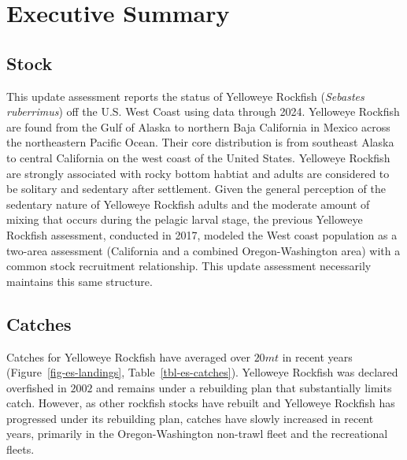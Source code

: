 \documentclass[
]{scrartcl}
\begin{document}
\newpage{}

\newpage{}


\section*{Executive Summary}\label{executive-summary}

\subsection*{Stock}\label{stock}

This update assessment reports the status of Yelloweye Rockfish
(\emph{Sebastes ruberrimus}) off the U.S. West Coast using data through
2024. Yelloweye Rockfish are found from the Gulf of Alaska to northern
Baja California in Mexico across the northeastern Pacific Ocean. Their
core distribution is from southeast Alaska to central California on the
west coast of the United States. Yelloweye Rockfish are strongly
associated with rocky bottom habtiat and adults are considered to be
solitary and sedentary after settlement. Given the general perception of
the sedentary nature of Yelloweye Rockfish adults and the moderate
amount of mixing that occurs during the pelagic larval stage, the
previous Yelloweye Rockfish assessment, conducted in 2017, modeled the
West coast population as a two-area assessment (California and a
combined Oregon-Washington area) with a common stock recruitment
relationship. This update assessment necessarily maintains this same
structure.

\subsection*{Catches}\label{catches}

Catches for Yelloweye Rockfish have averaged over \(20 mt\) in recent
years (Figure~\ref{fig-es-landings}, Table~\ref{tbl-es-catches}).
Yelloweye Rockfish was declared overfished in \(2002\) and remains under
a rebuilding plan that substantially limits catch. However, as other
rockfish stocks have rebuilt and Yelloweye Rockfish has progressed under
its rebuilding plan, catches have slowly increased in recent years,
primarily in the Oregon-Washington non-trawl fleet and the recreational
fleets.
\end{document}
